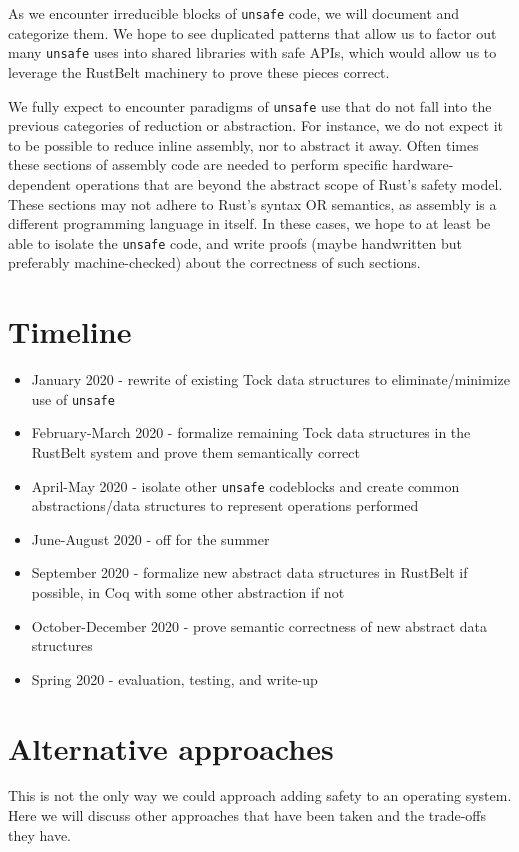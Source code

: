 \documentclass[12pt]{article}
\begin{document}
As we encounter irreducible blocks of \texttt{unsafe} code, we will document and categorize them. We hope to see duplicated patterns that allow us to factor out many \texttt{unsafe} uses into shared libraries with safe APIs, which would allow us to leverage the RustBelt machinery to prove these pieces correct.

We fully expect to encounter paradigms of \texttt{unsafe} use that do not fall into the previous categories of reduction or abstraction. For instance, we do not expect it to be possible to reduce inline assembly, nor to abstract it away. Often times these sections of assembly code are needed to perform specific hardware-dependent operations that are beyond the abstract scope of Rust's safety model. These sections may not adhere to Rust's syntax OR semantics, as assembly is a different programming language in itself. In these cases, we hope to at least be able to isolate the \texttt{unsafe} code, and write proofs (maybe handwritten but preferably machine-checked) about the correctness of such sections.



\section{Timeline}
\begin{itemize}
    \item January 2020 - rewrite of existing Tock data structures to eliminate/minimize use of \texttt{unsafe}
    \item February-March 2020 - formalize remaining Tock data structures in the RustBelt system and prove them semantically correct
    \item April-May 2020 - isolate other \texttt{unsafe} codeblocks and create common abstractions/data structures to represent operations performed
    \item June-August 2020 - off for the summer
    \item September 2020 - formalize new abstract data structures in RustBelt if possible, in Coq with some other abstraction if not
    \item October-December 2020 - prove semantic correctness of new abstract data structures
    \item Spring 2020 - evaluation, testing, and write-up
\end{itemize}

\section{Alternative approaches}
This is not the only way we could approach adding safety to an operating system. Here we will discuss other approaches that have been taken and the trade-offs they have.
\end{document}
